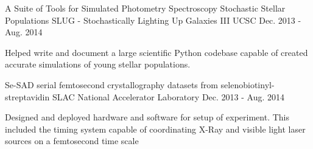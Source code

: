 \begin{cventries}
  \cventry
    {A Suite of Tools for Simulated Photometry Spectroscopy Stochastic Stellar Populations}
    {SLUG - Stochastically Lighting Up Galaxies III}
    {UCSC}
    {Dec. 2013 - Aug. 2014}
    {
      \begin{cvitems}
        \item {Helped write and document a large scientific Python codebase capable of created accurate simulations of young stellar populations.}
      \end{cvitems}
    }
  \cventry
    {}
    {Se-SAD serial femtosecond crystallography datasets from selenobiotinyl-streptavidin}
    {SLAC National Accelerator Laboratory}
    {Dec. 2013 - Aug. 2014}
    {
      \begin{cvitems}
        \item {Designed and deployed hardware and software for setup of
               experiment. This included the timing system capable of coordinating
               X-Ray and visible light laser sources on a femtosecond time scale}
      \end{cvitems}
    }
\end{cventries}
